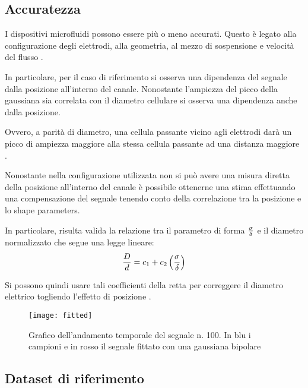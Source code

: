 \subsection{Accuratezza}


I dispositivi microfluidi possono essere più o meno accurati. Questo è legato alla configurazione degli elettrodi, alla geometria, al mezzo di sospensione e velocità del flusso \cite{sun_single-cell_2010}.

In particolare, per il caso di riferimento si osserva una dipendenza del segnale dalla posizione all'interno del canale. Nonostante l'ampiezza del picco della gaussiana sia correlata con il diametro cellulare si osserva una dipendenza anche dalla posizione.

Ovvero, a parità di diametro, una cellula passante vicino agli elettrodi darà un picco di ampiezza maggiore alla stessa cellula passante ad una distanza maggiore \cite{spencer_high_2016}.

Nonostante nella configurazione utilizzata non si può avere una misura diretta della posizione all'interno del canale è possibile ottenerne una stima effettuando una compensazione del segnale tenendo conto della correlazione tra la posizione e lo shape parameters.

In particolare, risulta valida la relazione tra il parametro di forma $\sigma \over \delta$ e il diametro normalizzato che segue una legge lineare:
\begin{equation}
	{D\over d}={c_1+c_2\left(\sigma \over \delta \right)}
	\label{eq:compensazione}
\end{equation}

Si possono quindi usare tali coefficienti della retta per correggere il diametro elettrico togliendo l'effetto di posizione \cite{errico_mitigating_2017}.



\begin{figure}[t!]
	\centering
	\texttt{[image: fitted]}
	\caption{Grafico dell'andamento temporale del segnale n. 100. In blu i campioni e in rosso il segnale fittato con una gaussiana bipolare}
	\label{fig:fitted}
\end{figure}




\subsection{Dataset di riferimento}

